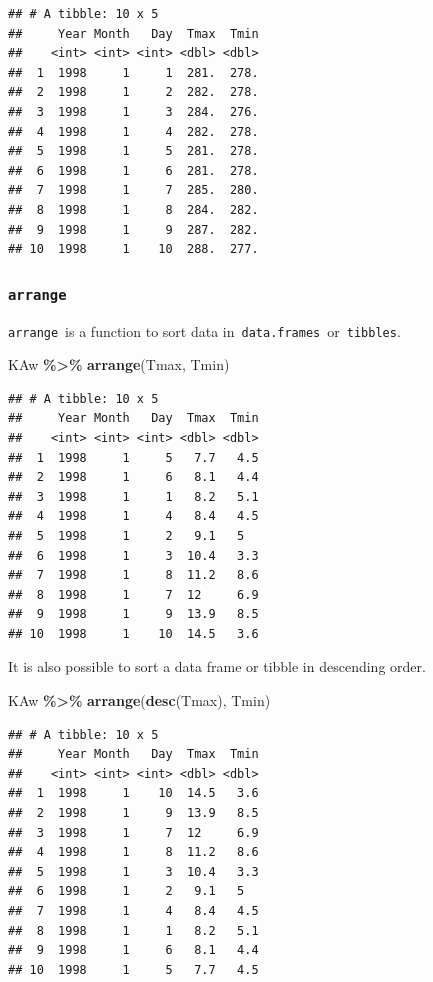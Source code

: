 \documentclass[
]{article}
\newenvironment{Shaded}{\begin{snugshade}}{\end{snugshade}}
\newcommand{\FunctionTok}[1]{\textcolor[rgb]{0.13,0.29,0.53}{\textbf{#1}}}
\newcommand{\NormalTok}[1]{#1}
\newcommand{\SpecialCharTok}[1]{\textcolor[rgb]{0.81,0.36,0.00}{\textbf{#1}}}
\begin{document}
\begin{verbatim}
## # A tibble: 10 x 5
##     Year Month   Day  Tmax  Tmin
##    <int> <int> <int> <dbl> <dbl>
##  1  1998     1     1  281.  278.
##  2  1998     1     2  282.  278.
##  3  1998     1     3  284.  276.
##  4  1998     1     4  282.  278.
##  5  1998     1     5  281.  278.
##  6  1998     1     6  281.  278.
##  7  1998     1     7  285.  280.
##  8  1998     1     8  284.  282.
##  9  1998     1     9  287.  282.
## 10  1998     1    10  288.  277.
\end{verbatim}

\subsubsection{\texorpdfstring{\texttt{arrange}}{arrange}}\label{arrange}

\texttt{arrange}~is a function to sort data in~\texttt{data.frames}~or~\texttt{tibbles}.

\begin{Shaded}
\begin{Highlighting}[]
\NormalTok{KAw }\SpecialCharTok{\%\textgreater{}\%} \FunctionTok{arrange}\NormalTok{(Tmax, Tmin)}
\end{Highlighting}
\end{Shaded}

\begin{verbatim}
## # A tibble: 10 x 5
##     Year Month   Day  Tmax  Tmin
##    <int> <int> <int> <dbl> <dbl>
##  1  1998     1     5   7.7   4.5
##  2  1998     1     6   8.1   4.4
##  3  1998     1     1   8.2   5.1
##  4  1998     1     4   8.4   4.5
##  5  1998     1     2   9.1   5  
##  6  1998     1     3  10.4   3.3
##  7  1998     1     8  11.2   8.6
##  8  1998     1     7  12     6.9
##  9  1998     1     9  13.9   8.5
## 10  1998     1    10  14.5   3.6
\end{verbatim}

It is also possible to sort a data frame or tibble in descending order.

\begin{Shaded}
\begin{Highlighting}[]
\NormalTok{KAw }\SpecialCharTok{\%\textgreater{}\%} \FunctionTok{arrange}\NormalTok{(}\FunctionTok{desc}\NormalTok{(Tmax), Tmin)}
\end{Highlighting}
\end{Shaded}

\begin{verbatim}
## # A tibble: 10 x 5
##     Year Month   Day  Tmax  Tmin
##    <int> <int> <int> <dbl> <dbl>
##  1  1998     1    10  14.5   3.6
##  2  1998     1     9  13.9   8.5
##  3  1998     1     7  12     6.9
##  4  1998     1     8  11.2   8.6
##  5  1998     1     3  10.4   3.3
##  6  1998     1     2   9.1   5  
##  7  1998     1     4   8.4   4.5
##  8  1998     1     1   8.2   5.1
##  9  1998     1     6   8.1   4.4
## 10  1998     1     5   7.7   4.5
\end{verbatim}
\end{document}

